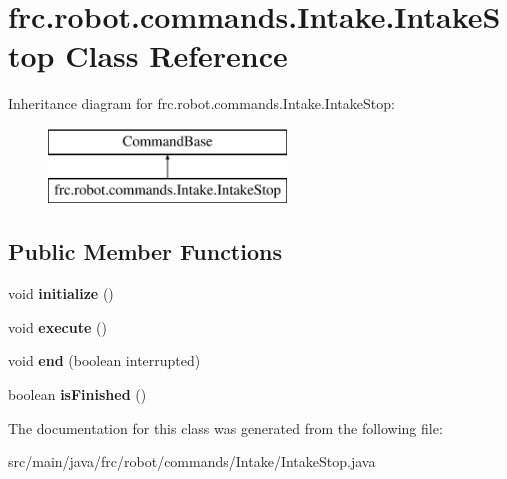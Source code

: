 \hypertarget{classfrc_1_1robot_1_1commands_1_1_intake_1_1_intake_stop}{}\section{frc.\+robot.\+commands.\+Intake.\+Intake\+Stop Class Reference}
\label{classfrc_1_1robot_1_1commands_1_1_intake_1_1_intake_stop}
Inheritance diagram for frc.\+robot.\+commands.\+Intake.\+Intake\+Stop\+:\begin{figure}[H]
\begin{center}
\leavevmode
\includegraphics[height=2.000000cm]{classfrc_1_1robot_1_1commands_1_1_intake_1_1_intake_stop}
\end{center}
\end{figure}
\subsection*{Public Member Functions}
\begin{DoxyCompactItemize}
\item 
\mbox{\label{classfrc_1_1robot_1_1commands_1_1_intake_1_1_intake_stop_a7d288073b569c256f40f9966d9cd6bb2}} 
void {\bfseries initialize} ()
\item 
\mbox{\label{classfrc_1_1robot_1_1commands_1_1_intake_1_1_intake_stop_a4c0daac9b4e0b2d980e7631499984b4f}} 
void {\bfseries execute} ()
\item 
\mbox{\label{classfrc_1_1robot_1_1commands_1_1_intake_1_1_intake_stop_aca3a9892b24d755189781a7b72eaef13}} 
void {\bfseries end} (boolean interrupted)
\item 
\mbox{\label{classfrc_1_1robot_1_1commands_1_1_intake_1_1_intake_stop_a5ae3b5f8d8e9e74268ef42ec588e1197}} 
boolean {\bfseries is\+Finished} ()
\end{DoxyCompactItemize}


The documentation for this class was generated from the following file\+:\begin{DoxyCompactItemize}
\item 
src/main/java/frc/robot/commands/\+Intake/Intake\+Stop.\+java\end{DoxyCompactItemize}
